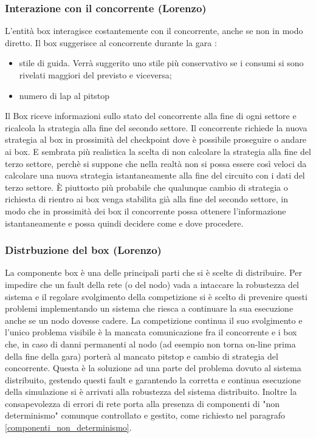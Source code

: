 \subsubsection{Interazione con il concorrente (Lorenzo)}
L'entità box interagisce costantemente con il concorrente, anche se non in modo
diretto.
Il box suggerisce al concorrente durante la gara :
\begin{itemize}
\item stile di guida. Verrà suggerito uno stile più conservativo se i consumi si
sono rivelati maggiori del previsto e viceversa;
\item numero di lap al pitstop
\end{itemize}
Il Box riceve informazioni sullo stato del concorrente alla fine di ogni settore
e ricalcola la strategia alla fine del secondo settore. Il concorrente richiede
la  nuova strategia al box in prossimità del checkpoint dove è possibile
proseguire o andare ai box.
E sembrata più realistica la scelta di non calcolare la strategia alla fine del
terzo settore, perchè si suppone che nella realtà non si possa essere così
veloci da calcolare una nuova strategia istantaneamente alla fine del circuito
con i dati del terzo settore. \`{E} piuttosto più probabile che qualunque cambio
di strategia o richiesta di rientro ai box venga stabilita già alla fine del
secondo settore, in modo che in prossimità dei box il concorrente possa ottenere
l’informazione istantaneamente e possa quindi decidere come e dove procedere.
     \subsubsection{Distrbuzione del box (Lorenzo)}
La componente box è una delle principali parti che si è scelte di distribuire.
Per impedire che un fault della rete (o del nodo) vada a intaccare la robustezza
del sistema e il regolare svolgimento della competizione si è scelto di
prevenire questi problemi implementando un sistema che riesca a continuare la
sua esecuzione anche se un nodo dovesse cadere. La competizione continua il suo
svolgimento e l'unico problema visibile è la mancata comunicazione fra il
concorrente e i box che, in caso di danni permanenti al nodo (ad esempio non
torna on-line prima della fine della gara) porterà al mancato pitstop e cambio
di strategia del concorrente. Questa è la soluzione ad una parte del problema
dovuto al sistema distribuito, gestendo questi fault e garantendo la corretta e
continua esecuzione della simulazione si è arrivati alla robustezza del sistema
distribuito.
Inoltre la consapevolezza di errori di rete porta alla presenza di componenti di
"non determinismo" comunque controllato e gestito, come richiesto nel paragrafo
\ref{componenti_non_determinismo}.
